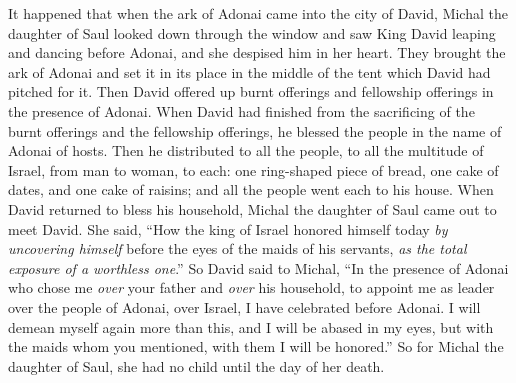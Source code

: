 \begin{biblechapter}
\verse It happened that when the ark of Adonai came into the city of David, Michal the daughter of Saul looked down through the window and saw King David leaping and dancing before Adonai, and she despised him in her heart.
\verse They brought the ark of Adonai and set it in its place in the middle of the tent which David had pitched for it. Then David offered up burnt offerings and fellowship offerings in the presence of Adonai.
\verse When David had finished from the sacrificing of the burnt offerings and the fellowship offerings, he blessed the people in the name of Adonai of hosts.
\verse Then he distributed to all the people, to all the multitude of Israel, from man to woman, to each: one ring-shaped piece of bread, one cake of dates, and one cake of raisins; and all the people went each to his house.
\verse When David returned to bless his household, Michal the daughter of Saul came out to meet David. She said, “How the king of Israel honored himself today \textit{by uncovering himself} before the eyes of the maids of his servants, \textit{as the total exposure of a worthless one}.”
\verse So David said to Michal, “In the presence of Adonai who chose me \textit{over} your father and \textit{over} his household, to appoint me as leader over the people of Adonai, over Israel, I have celebrated before Adonai.
\verse I will demean myself again more than this, and I will be abased in my eyes, but with the maids whom you mentioned, with them I will be honored.”
\verse So for Michal the daughter of Saul, she had no child until the day of her death.
\end{biblechapter}

